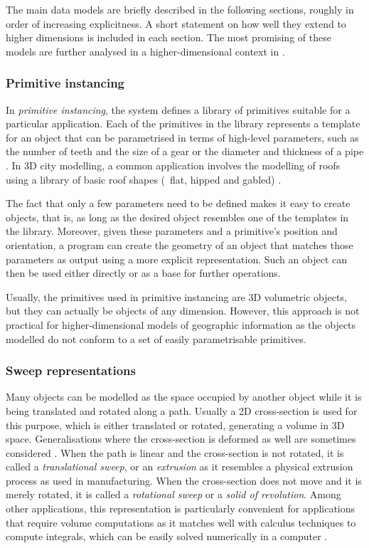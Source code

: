 The main data models are briefly described in the following sections, roughly in order of increasing explicitness.
A short statement on how well they extend to higher dimensions is included in each section.
The most promising of these models are further analysed in a higher-dimensional context in .

\subsubsection{Primitive instancing}

In \emph{primitive instancing}, the system defines a library of primitives suitable for a particular application.
Each of the primitives in the library represents a template for an object that can be parametrised in terms of high-level parameters, such as the number of teeth and the size of a gear or the diameter and thickness of a pipe \citep{Foley95}.
In 3D city modelling, a common application involves the modelling of roofs using a library of basic roof shapes (\eg\ flat, hipped and gabled) \citep{Kada07}.

The fact that only a few parameters need to be defined makes it easy to create objects, that is, as long as the desired object resembles one of the templates in the library.
Moreover, given these parameters and a primitive's position and orientation, a program can create the geometry of an object that matches those parameters as output using a more explicit representation.
Such an object can then be used either directly or as a base for further operations.

Usually, the primitives used in primitive instancing are 3D volumetric objects, but they can actually be objects of any dimension.
However, this approach is not practical for higher-dimensional models of geographic information as the objects modelled do not conform to a set of easily parametrisable primitives.

\subsubsection{Sweep representations}

Many objects can be modelled as the space occupied by another object while it is being translated and rotated along a path.
Usually a 2D cross-section is used for this purpose, which is either translated or rotated, generating a volume in 3D space.
Generalisations where the cross-section is deformed as well are sometimes considered \citep{Blackmore94}.
When the path is linear and the cross-section is not rotated, it is called a \emph{translational sweep}, or an \emph{extrusion} as it resembles a physical extrusion process as used in manufacturing.
When the cross-section does not move and it is merely rotated, it is called a \emph{rotational sweep} or a \emph{solid of revolution}.
Among other applications, this representation is particularly convenient for applications that require volume computations as it matches well with calculus techniques to compute integrals, which can be easily solved numerically in a computer \citep{Lee82}.

